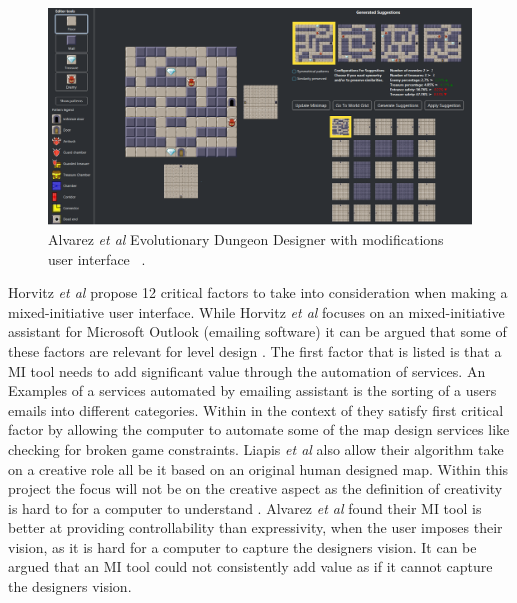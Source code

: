 \documentclass[journal]{IEEEtran}
\begin{document}
\begin{figure}[h]
	\includegraphics[width=1.0\linewidth]{EDD2.PNG}
	\caption{ Alvarez \textit{et al} Evolutionary Dungeon Designer with modifications user interface  ~\cite{alvarez2018fostering}.}
	\label{EDD2}
\end{figure} 

Horvitz \textit{et al} \cite{horvitz1999principles} propose 12 critical factors to take into consideration when making a mixed-initiative user interface. While Horvitz \textit{et al} \cite{horvitz1999principles}  focuses on an mixed-initiative assistant for Microsoft Outlook (emailing software) it can be argued that some of these factors are relevant for level design .  The first factor that is listed is that a MI tool needs to add significant value through the automation of services. An Examples of a services automated by emailing assistant is the sorting of a users emails into different categories.   Within in the context of \cite{liapis2013sentient}  they satisfy \cite{horvitz1999principles} first critical factor by allowing the computer to automate some of the map design services like checking for broken game constraints. Liapis \textit{et al} \cite{liapis2013sentient} also allow their algorithm take on a creative role all be it based on an original human designed map. Within this project the focus will not be on the creative aspect as the definition of creativity is hard to for a computer to understand \cite{jordanous2010defining}. Alvarez \textit{et al}\cite{alvarez2018fostering} found their MI tool is better at providing controllability than expressivity, when the user imposes their vision, as it is hard for a computer to capture the designers vision. It can be argued that an MI tool could not consistently add value as if it cannot capture the designers vision.
\end{document}
